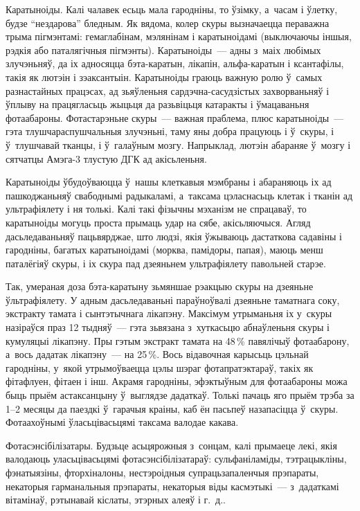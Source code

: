 Каратыноіды. Калі чалавек есьць мала гародніны, то ўзімку, а~часам і ўлетку, будзе ``нездарова'' бледным. Як вядома, колер скуры вызначаецца пераважна трыма пігмэнтамі: гемаглабінам, мэлянінам і каратыноідамі (выключаючы іншыя, рэдкія або паталягічныя пігмэнты). Каратыноіды~--- адны з~маіх любімых злучэньняў, да іх адносяцца бэта-каратын, лікапін, альфа-каратын і ксантафілы, такія як лютэін і зэаксантыін. Каратыноіды граюць важную ролю ў~самых разнастайных працэсах, ад зьяўленьня сардэчна-сасудзістых захворваньняў і ўплыву на працягласьць жыцьця да разьвіцьця катаракты і ўмацаваньня фотаабароны. Фотастарэньне скуры~--- важная праблема, плюс каратыноіды~--- гэта тлушчараспушчальныя злучэньні, таму яны добра працуюць і ў~скуры, і ў~тлушчавай тканцы, і ў~галаўным мозгу. Напрыклад, лютэін абараняе ў~мозгу і сятчатцы Амэга-3 тлустую ДГК ад акісьленьня. 

Каратыноіды ўбудоўваюцца ў~нашы клеткавыя мэмбраны і абараняюць іх ад пашкоджаньняў свабоднымі радыкаламі, а~таксама цэласнасьць клетак і тканін ад ультрафіялету і ня толькі. Калі такі фізычны мэханізм не спрацаваў, то каратыноіды могуць проста прымаць удар на сябе, акісьляючыся. Агляд дасьледаваньняў пацьвярджае, што людзі, якія ўжываюць дастаткова садавіны і гародніны, багатых каратыноідамі (морква, памідоры, папая), маюць менш паталёгіяў скуры, і іх скура пад дзеяньнем ультрафіялету павольней старэе.

Так, умераная доза бэта-каратыну зьмяншае рэакцыю скуры на дзеяньне ўльтрафіялету. У адным дасьледаваньні параўноўвалі дзеяньне таматнага соку, экстракту тамата і сынтэтычнага лікапэну. Максімум утрыманьня іх у~скуры назіраўся праз 12 тыдняў~--- гэта зьвязана з~хуткасьцю абнаўленьня скуры і кумуляцыі лікапэну. Пры гэтым экстракт тамата на 48\,\% павялічыў фотаабарону, а~вось дадатак лікапэну~--- на 25\,\%. Вось відавочная карысьць цэльнай гародніны, у~якой утрымоўваецца цэлы шэраг фотапратэктараў, такіх як фітафлуен, фітаен і інш. Акрамя гародніны, эфэктыўным для фотаабароны можа быць прыём астаксанцыну ў~выглядзе дадаткаў. Толькі пачаць яго прыём трэба за 1--2 месяцы да паездкі ў~гарачыя краіны, каб ён пасьпеў назапасіцца ў~скуры. Фотаахоўнымі ўласьцівасьцямі таксама валодае какава.

Фотасэнсібілізатары. Будзьце асьцярожныя з~сонцам, калі прымаеце лекі, якія валодаюць уласьцівасьцямі фотасэнсібілізатараў: сульфаніламіды, тэтрацыкліны, фэнатыязіны, фторхіналоны, нестэроідныя супрацьзапаленчыя прэпараты, некаторыя гарманальныя прэпараты, некаторыя віды касмэтыкі~--- з~дадаткамі вітамінаў, рэтынавай кіслаты, этэрных алеяў і г.~д..

